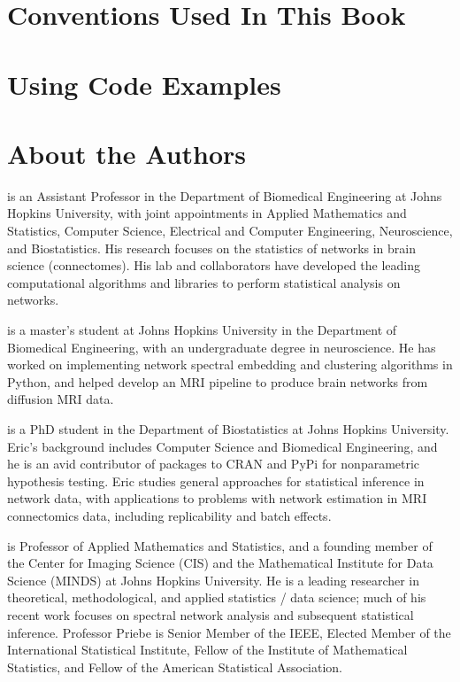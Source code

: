 \documentclass[letterpaper,10pt,english]{jupyterBook}
\begin{document}
\section{Conventions Used In This Book}
\label{\detokenize{introduction/preface:conventions-used-in-this-book}}

\section{Using Code Examples}
\label{\detokenize{introduction/preface:using-code-examples}}

\section{About the Authors}
\label{\detokenize{introduction/preface:about-the-authors}}
\sphinxAtStartPar
{} is an Assistant Professor in the Department of Biomedical Engineering at Johns Hopkins University, with joint appointments in Applied Mathematics and Statistics, Computer Science, Electrical and Computer Engineering, Neuroscience, and Biostatistics. His research focuses on the statistics of networks in brain science (connectomes). His lab and collaborators have developed the leading computational algorithms and libraries to perform statistical analysis on networks.

\sphinxAtStartPar
{} is a master’s student at Johns Hopkins University in the Department of Biomedical Engineering, with an undergraduate degree in neuroscience. He has worked on implementing network spectral embedding and clustering algorithms in Python, and helped develop an MRI pipeline to produce brain networks from diffusion MRI data.

\sphinxAtStartPar
{} is a PhD student in the Department of Biostatistics at Johns Hopkins University. Eric’s background includes Computer Science and Biomedical Engineering, and he is an avid contributor of packages to CRAN and PyPi for nonparametric hypothesis testing. Eric studies general approaches for statistical inference in network data, with applications to problems with network estimation in MRI connectomics data, including replicability and batch effects.

\sphinxAtStartPar
{} is Professor of Applied Mathematics and Statistics, and a founding member of the Center for Imaging Science (CIS) and the Mathematical Institute for Data Science (MINDS) at Johns Hopkins University. He is a leading researcher in theoretical, methodological, and applied statistics / data science; much of his recent work focuses on spectral network analysis and subsequent statistical inference. Professor Priebe is Senior Member of the IEEE, Elected Member of the International Statistical Institute, Fellow of the Institute of Mathematical Statistics, and Fellow of the American Statistical Association.
\end{document}
